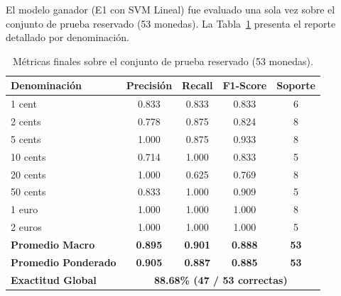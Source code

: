 \documentclass[journal,compsoc,twoside]{IEEEtran}
\begin{document}
El modelo ganador (E1 con SVM Lineal) fue evaluado una sola vez sobre el conjunto de prueba reservado (53 monedas). La Tabla~\ref{tab:test_metrics} presenta el reporte detallado por denominación.

\begin{table}[htbp]
\caption{Métricas finales sobre el conjunto de prueba reservado (53 monedas).}
\label{tab:test_metrics}
\centering
\begin{tabular}{lcccc}
\toprule
\textbf{Denominación} & \textbf{Precisión} & \textbf{Recall} & \textbf{F1-Score} & \textbf{Soporte} \\
\midrule
1 cent   & 0.833 & 0.833 & 0.833 & 6 \\
2 cents  & 0.778 & 0.875 & 0.824 & 8 \\
5 cents  & 1.000 & 0.875 & 0.933 & 8 \\
10 cents & 0.714 & 1.000 & 0.833 & 5 \\
20 cents & 1.000 & 0.625 & 0.769 & 8 \\
50 cents & 0.833 & 1.000 & 0.909 & 5 \\
1 euro   & 1.000 & 1.000 & 1.000 & 8 \\
2 euros  & 1.000 & 1.000 & 1.000 & 5 \\
\midrule
\textbf{Promedio Macro} & \textbf{0.895} & \textbf{0.901} & \textbf{0.888} & \textbf{53} \\
\textbf{Promedio Ponderado} & \textbf{0.905} & \textbf{0.887} & \textbf{0.885} & \textbf{53} \\
\textbf{Exactitud Global} & \multicolumn{4}{c}{\textbf{88.68\% (47 / 53 correctas)}} \\
\bottomrule
\end{tabular}
\end{table}
\end{document}
